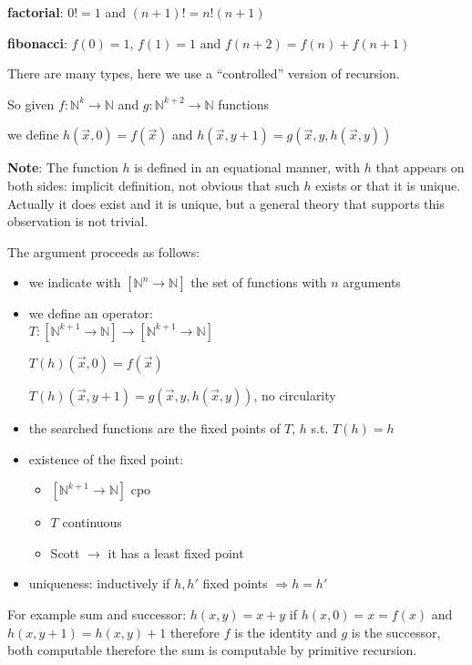 \documentclass{amsbook}
\newcommand{\nat}{\ensuremath{\mathbb{N}}}
\theoremstyle{definition}
\theoremstyle{remark}
\numberwithin{section}{chapter}
\numberwithin{equation}{chapter}
\begin{document}
\textbf{factorial}: $0! = 1$ and $(n+1)! = n!(n+1)$

\textbf{fibonacci}: $f(0) = 1$, $f(1) = 1$ and $f(n+2) = f(n) + f(n+1)$

There are many types, here we use a ``controlled'' version of recursion.

So given $f:\nat^k\rightarrow\nat$ and $g:\nat^{k+2}\rightarrow\nat$ functions

we define $ h(\vec{x},0) = f(\vec{x}) $ and $ h(\vec{x}, y+1) = g(\vec{x},y,h(\vec{x},y)) $

\textbf{Note}: The function $h$ is defined in an equational manner, with $h$ that appears on both sides: implicit definition, not obvious that such $h$ exists or that it is unique. Actually it does exist and it is unique, but a general theory that supports this observation is not trivial.

The argument proceeds as follows:

\begin{itemize}
	\item we indicate with $[\nat^n\rightarrow\nat]$ the set of functions with $n$ arguments
	\item we define an operator:\\
	      $T: [\nat^{k+1}\rightarrow\nat] \rightarrow [\nat^{k+1}\rightarrow\nat]$

	      $T(h)(\vec{x},0) = f(\vec{x})$

	      $T(h)(\vec{x},y+1) = g(\vec{x},y,h(\vec{x},y))$, no circularity
	\item the searched functions are the fixed points of $T$, $h$ s.t. $T(h) = h$
	\item existence of the fixed point:
	      \begin{itemize}
		      \item $[\nat^{k+1}\rightarrow\nat]$ cpo
		      \item $T$ continuous
		      \item Scott $\rightarrow$ it has a least fixed point
	      \end{itemize}
	\item uniqueness: inductively if $h,h'$ fixed points $\Rightarrow h=h'$
\end{itemize}

For example sum and successor: $ h(x,y) = x+y $ if $ h(x,0) = x = f(x) $ and $ h(x,y+1) = h(x,y) + 1 $ therefore $f$ is the identity and $g$ is the successor, both computable therefore the sum is computable by primitive recursion.
\end{document}
